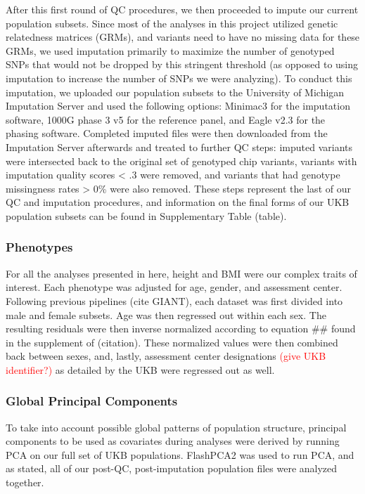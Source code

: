 \documentclass[12pt, a4paper]{article}
\begin{document}
After this first round of QC procedures, we then proceeded to impute our current population subsets. Since most of the analyses in this project utilized genetic relatedness matrices (GRMs), and variants need to have no missing data for these GRMs, we used imputation primarily to maximize the number of genotyped SNPs that would not be dropped by this stringent threshold (as opposed to using imputation to increase the number of SNPs we were analyzing). To conduct this imputation, we uploaded our population subsets to the University of Michigan Imputation Server \citep{Das2016} and used the following options: Minimac3 for the imputation software, 1000G phase 3 v5 for the reference panel, and Eagle v2.3 for the phasing software. Completed imputed files were then downloaded from the Imputation Server afterwards and treated to further QC steps: imputed variants were intersected back to the original set of genotyped chip variants, variants with imputation quality scores < .3 were removed, and variants that had genotype missingness rates > 0\% were also removed. These steps represent the last of our QC and imputation procedures, and information on the final forms of our UKB population subsets can be found in Supplementary Table (table).

\subsubsection{Phenotypes}

For all the analyses presented in here, height and BMI were our complex traits of interest. Each phenotype was adjusted for age, gender, and assessment center. Following previous pipelines (cite GIANT), each dataset was first divided into male and female subsets. Age was then regressed out within each sex. The resulting residuals were then inverse normalized according to equation \#\# found in the supplement of (citation). These normalized values were then combined back between sexes, and, lastly, assessment center designations \textcolor{red}{(give UKB identifier?)} as detailed by the UKB were regressed out as well. 

\subsubsection{Global Principal Components}

To take into account possible global patterns of population structure, principal components to be used as covariates during analyses were derived by running PCA on our full set of UKB populations. FlashPCA2 was used to run PCA, and as stated, all of our post-QC, post-imputation population files were analyzed together.    
\end{document}
